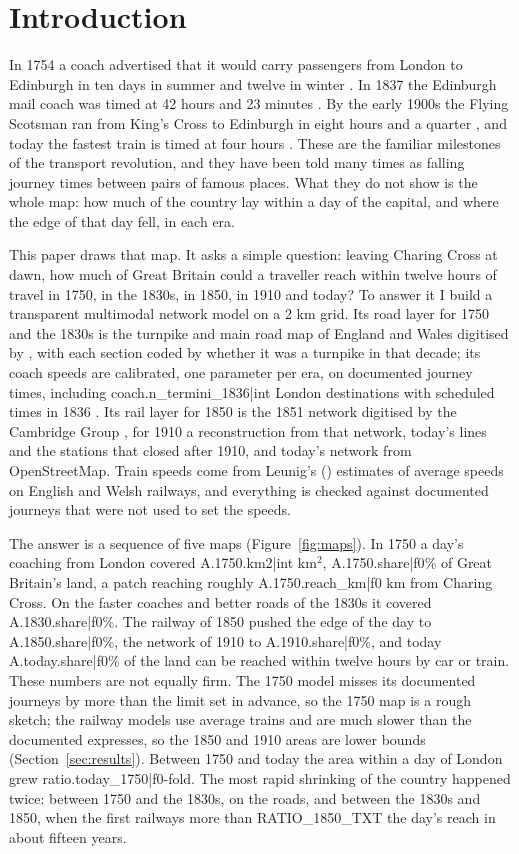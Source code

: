 \section{Introduction}
In 1754 a coach advertised that it would carry passengers from London to Edinburgh in ten days in summer and twelve in winter \citep{harper1922}. In 1837 the Edinburgh mail coach was timed at 42 hours and 23 minutes \citep{harper1903}. By the early 1900s the Flying Scotsman ran from King's Cross to Edinburgh in eight hours and a quarter \citep{wiki_fs}, and today the fastest train is timed at four hours \citep{visitlondon}. These are the familiar milestones of the transport revolution, and they have been told many times as falling journey times between pairs of famous places. What they do not show is the whole map: how much of the country lay within a day of the capital, and where the edge of that day fell, in each era.

This paper draws that map. It asks a simple question: leaving Charing Cross at dawn, how much of Great Britain could a traveller reach within twelve hours of travel in 1750, in the 1830s, in 1850, in 1910 and today? To answer it I build a transparent multimodal network model on a 2 km grid. Its road layer for 1750 and the 1830s is the turnpike and main road map of England and Wales digitised by \citet{rosevear2023tp}, with each section coded by whether it was a turnpike in that decade; its coach speeds are calibrated, one parameter per era, on documented journey times, including {{coach.n_termini_1836|int}} London destinations with scheduled times in 1836 \citep{bates1969,rosevear2023coach}. Its rail layer for 1850 is the 1851 network digitised by the Cambridge Group \citep{satchell2023}, for 1910 a reconstruction from that network, today's lines and the stations that closed after 1910, and today's network from OpenStreetMap. Train speeds come from Leunig's (\citeyear{leunig2006}) estimates of average speeds on English and Welsh railways, and everything is checked against documented journeys that were not used to set the speeds.

The answer is a sequence of five maps (Figure~\ref{fig:maps}). In 1750 a day's coaching from London covered {{A.1750.km2|int}} km$^2$, {{A.1750.share|f0}}\% of Great Britain's land, a patch reaching roughly {{A.1750.reach_km|f0}} km from Charing Cross. On the faster coaches and better roads of the 1830s it covered {{A.1830.share|f0}}\%. The railway of 1850 pushed the edge of the day to {{A.1850.share|f0}}\%, the network of 1910 to {{A.1910.share|f0}}\%, and today {{A.today.share|f0}}\% of the land can be reached within twelve hours by car or train. These numbers are not equally firm. The 1750 model misses its documented journeys by more than the limit set in advance, so the 1750 map is a rough sketch; the railway models use average trains and are much slower than the documented expresses, so the 1850 and 1910 areas are lower bounds (Section~\ref{sec:results}). Between 1750 and today the area within a day of London grew {{ratio.today_1750|f0}}-fold. The most rapid shrinking of the country happened twice: between 1750 and the 1830s, on the roads, and between the 1830s and 1850, when the first railways more than {{RATIO_1850_TXT}} the day's reach in about fifteen years.

